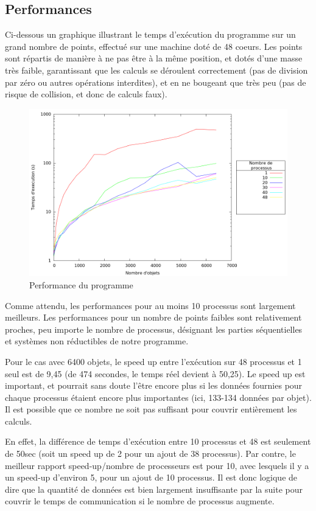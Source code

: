 \documentclass[a4paper,11pt]{article}
\begin{document}
\subsection{Performances}
Ci-dessous un graphique illustrant le temps d'exécution du programme sur un grand nombre de points, effectué sur une machine doté de 48 coeurs. 
Les points sont répartis de manière à ne pas être à la même position, et dotés d'une masse très faible, garantissant que les calculs se déroulent correctement (pas de division par zéro ou autres opérations interdites), et en ne bougeant que très peu (pas de risque de collision, et donc de calculs faux). 

\begin{figure}[h!]
  \centering
  \includegraphics[width=\textwidth]{perf.png}
  \caption{Performance du programme}
  \label{perf}
\end{figure}

Comme attendu, les performances pour au moins 10 processus sont largement meilleurs.
Les performances pour un nombre de points faibles sont relativement proches, peu importe le nombre de processus, désignant les parties séquentielles et systèmes non réductibles de notre programme.

Pour le cas avec 6400 objets, le speed up entre l'exécution sur 48 processus et 1 seul est de 9,45 (de 474 secondes, le temps réel devient à 50,25).
Le speed up est important, et pourrait sans doute l'être encore plus si les données fournies pour chaque processus étaient encore plus importantes (ici, 133-134 données par objet).
Il est possible que ce nombre ne soit pas suffisant pour couvrir entièrement les calculs. 

En effet, la différence de temps d'exécution entre 10 processus et 48 est seulement de 50sec (soit un speed up de 2 pour un ajout de 38 processus).
Par contre, le meilleur rapport speed-up/nombre de processeurs est pour 10, avec lesquels il y a un speed-up d'environ 5, pour un ajout de 10 processus.
Il est donc logique de dire que la quantité de données est bien largement insuffisante par la suite pour couvrir le temps de communication si le nombre de processus augmente. 
\end{document}
